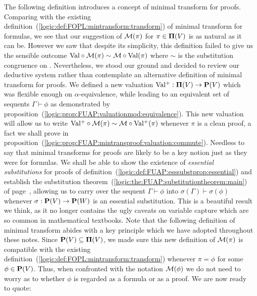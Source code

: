The following definition introduces a concept of minimal transform
for proofs. Comparing with the existing
definition~(\ref{logic:def:FOPL:mintransform:transform}) of minimal
transform for formulas, we see that our suggestion of ${\cal
M}(\pi)$ for $\pi\in\mbox{${\bf\Pi}(V)$}$ is as natural as it can be. However we saw
that despite its simplicity, this definition failed to give us the
sensible outcome $\mbox{\rm Val}\circ{\cal M}(\pi)\sim{\cal M}\circ\mbox{\rm Val}(\pi)$
where $\sim$ is the substitution congruence on \pvb. Nevertheless,
we stood our ground and decided to review our deductive system
rather than contemplate an alternative definition of minimal
transform for proofs. We defined a new valuation $\mbox{$\rm Val^{+}$}:\mbox{${\bf\Pi}(V)$}\to\mbox{${\bf P}(V)$}$
which was flexible enough on $\alpha$-equivalence, while leading to
an equivalent set of sequents $\Gamma\vdash\phi$ as demonstrated by
proposition~(\ref{logic:prop:FUAP:valuationmod:equivalence}). This
new valuation will allow us to write $\mbox{$\rm Val^{+}$}\circ{\cal
M}(\pi)\sim{\cal M}\circ\mbox{$\rm Val^{+}$}(\pi)$ whenever $\pi$ is a clean proof,
a fact we shall prove in
proposition~(\ref{logic:prop:FUAP:mintransproof:valuation:commute}).
Needless to say that minimal transforms for proofs are likely to be
a key notion just as they were for formulas. We shall be able to
show the existence of {\em essential substitutions} for proofs of
definition~(\ref{logic:def:FUAP:esssubstprop:essential}) and
establish the substitution
theorem~(\ref{logic:the:FUAP:substitutiontheorem:main}) of
page~\pageref{logic:the:FUAP:substitutiontheorem:main}, allowing us
to carry over the sequent $\Gamma\vdash\phi$ into
$\sigma(\Gamma)\vdash\sigma(\phi)$ whenever $\sigma:\mbox{${\bf P}(V)$}\to{\bf
P}(W)$ is an essential substitution. This is a beautiful result we
think, as it no longer contains the ugly caveats on variable capture
which are so common in mathematical textbooks. Note that the
following definition of minimal transform abides with a key
principle which we have adopted throughout these notes. Since
$\mbox{${\bf P}(V)$}\subseteq\mbox{${\bf\Pi}(V)$}$, we made sure this new definition of ${\cal
M}(\pi)$ is compatible with the existing
definition~(\ref{logic:def:FOPL:mintransform:transform}) whenever
$\pi=\phi$ for some $\phi\in\mbox{${\bf P}(V)$}$. Thus, when confronted with the
notation ${\cal M}(\phi)$ we do not need to worry as to whether
$\phi$ is regarded as a formula or as a proof. We are now ready to
quote:

